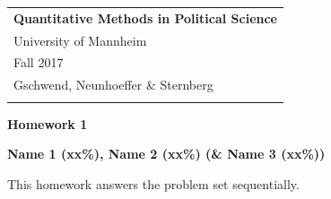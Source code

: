 \documentclass[a4paper,12pt]{article} %
\begin{document}



\thispagestyle{empty} %

\begin{tabular}{p{15.5cm}} %
{\large \bf Quantitative Methods in Political Science} \\
University of Mannheim \\ Fall 2017  \\ Gschwend, Neunhoeffer \& Sternberg\\
\hline %
\\
\end{tabular} %

\vspace*{0.3cm} %

\begin{center} %
	{\Large \bf Homework 1} %
	\vspace{2mm}
	
	{\bf Name 1 (xx\%), Name 2 (xx\%) (\& Name 3 (xx\%))} %
		
\end{center}  

\vspace{0.4cm}



This homework answers the problem set sequentially. 
\end{document}
